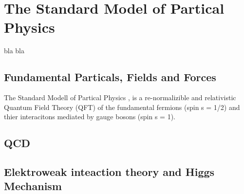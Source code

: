 \chapter{The Standard Model of Partical Physics}
\label{sec:SM}
bla bla

\section{Fundamental  Particals, Fields and Forces }\label{key:SM 2}

The Standard Modell of Partical Physics \cite{glashow1961partial,glashow1970weak,gross1973asymptotically,politzer1973reliable,politzer1974asymptotic,salam1964electromagnetic,weinberg1967model}, is a re-normalizible and relativistic Quantum Field Theory (QFT) of the fundamental fermions (spin s = 1/2) and thier interacitons mediated by gauge bosons (spin s = 1).






\section{QCD}

\section{Elektroweak inteaction theory and Higgs Mechanism}